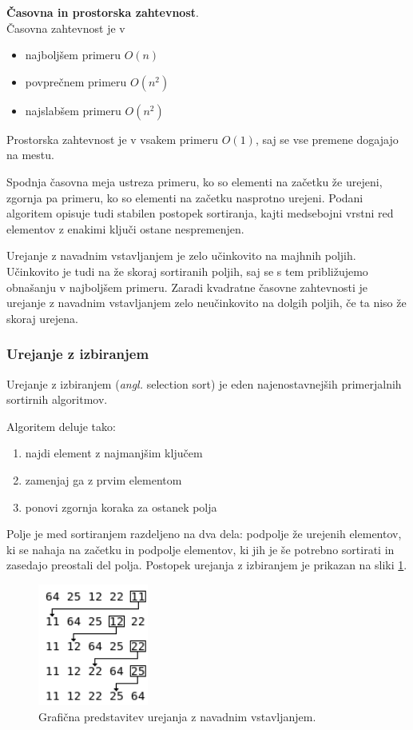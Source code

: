 \documentclass[a4paper,oneside]{article}
\begin{document}
\textbf{Časovna in prostorska zahtevnost}. \\
Časovna zahtevnost je v 
\begin{itemize}
  \item najboljšem primeru $O(n)$
  \item povprečnem primeru $O(n^2)$
  \item najslabšem primeru $O(n^2)$
\end{itemize}

Prostorska zahtevnost je v vsakem primeru $O(1)$, saj se vse premene dogajajo na
mestu.\newline

Spodnja časovna meja ustreza primeru, ko so elementi na začetku že urejeni, zgornja pa primeru,
ko so elementi na začetku nasprotno urejeni. Podani algoritem opisuje tudi stabilen postopek sortiranja, kajti medsebojni
vrstni red elementov z enakimi ključi ostane nespremenjen.

Urejanje z navadnim vstavljanjem je zelo učinkovito na majhnih poljih. Učinkovito je tudi na že
skoraj sortiranih poljih, saj se s tem približujemo obnašanju v najboljšem primeru.
Zaradi kvadratne časovne zahtevnosti je urejanje z navadnim vstavljanjem zelo neučinkovito na
dolgih poljih, če ta niso že skoraj urejena.

\subsubsection{Urejanje z izbiranjem}
\label{chapter:selectionsort}
Urejanje z izbiranjem (\emph{angl.} selection sort) je eden najenostavnejših primerjalnih sortirnih
algoritmov.

Algoritem deluje tako:
\begin{enumerate}
  \item najdi element z najmanjšim ključem
  \item zamenjaj ga z prvim elementom
  \item ponovi zgornja koraka za ostanek polja
\end{enumerate}

Polje je med sortiranjem razdeljeno na dva dela: podpolje že urejenih elementov, ki se
nahaja na začetku in podpolje elementov, ki jih je še potrebno sortirati in zasedajo
preostali del polja.
Postopek urejanja z izbiranjem je prikazan na sliki \ref{fig:selectionsortimage}.

\begin{figure}[h]
    \begin{center}
        \includegraphics[height=40mm]{slike/selectionsort.png}
    \end{center}
    \vspace{-0.7cm}
    \caption{Grafična predstavitev urejanja z navadnim vstavljanjem.}
    \label{fig:selectionsortimage}
\end{figure}
\end{document}
